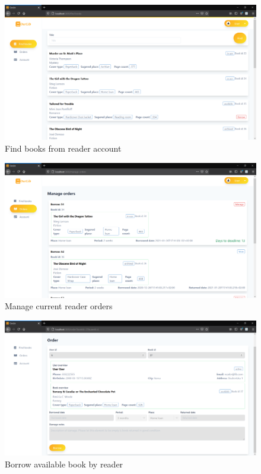 \begin{figure}[H]
    \centering
    \includegraphics[width=\textwidth]{Include/Resources/FrontendScreens/React/readerFindBooks.png}
    \caption{Find books from reader account}
    \label{fig:ScreenshotGUIreaderFindBooks}
\end{figure}




\begin{figure}[H]
    \centering
    \includegraphics[width=\textwidth]{Include/Resources/FrontendScreens/React/readerOrders.png}
    \caption{Manage current reader orders}
    \label{fig:ScreenshotGUIreaderOrders}
\end{figure}




\begin{figure}[H]
    \centering
    \includegraphics[width=\textwidth]{Include/Resources/FrontendScreens/React/readerBorrow.png}
    \caption{Borrow available book by reader}
    \label{fig:ScreenshotGUIreaderBorrow}
\end{figure}





